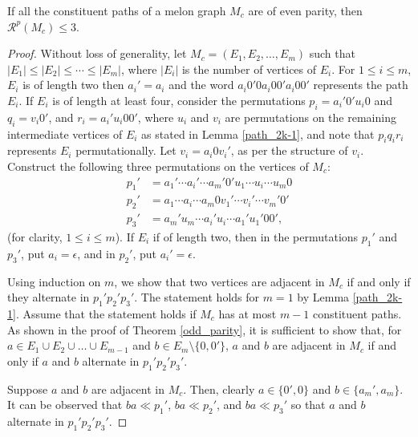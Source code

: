 \documentclass{llncs}
\begin{document}
\begin{theorem}\label{even_parity}
	If all the constituent paths of a melon graph $M_c$ are of even parity, then $\mathcal{R}^p(M_c) \le 3$.
\end{theorem}
\begin{proof}
	Without loss of generality, let $M_c = (E_1,E_2, \ldots, E_m)$ such that $|E_1| \le |E_2|\le \cdots \le |E_m|$, where $|E_i|$ is the number of vertices of $E_i$. For $1 \le i \le m$, $E_i$ is of length two then $a_i' = a_i$ and the word $a_i 0'0 a_i 0  0' a_i 0 0' $ represents the path $E_i$. If $E_i$ is of length at least four, consider the permutations $p_i = a_i' 0' u_i 0$  and $q_i = v_i 0'$, and $r_i = a_i' u_i 0 0'$, where $u_i$ and $v_i$ are permutations on the remaining intermediate vertices of $E_i$ as stated in Lemma \ref{path_2k-1}, and note that $p_iq_ir_i$ represents $E_i$ permutationally. Let $v_i = a_i0v_i'$, as per the structure of $v_i$. Construct the following three permutations on the vertices of $M_c$: 
	\begin{align*}
		p_1' &= a_1' \cdots a_i' \cdots a_m' 0' u_1  \cdots u_i \cdots  u_m 0 \\
		p_2' &= a_1  \cdots a_i  \cdots a_m  0  v_1'  \cdots v_i' \cdots v_m' 0'\\
		p_3' &= a_m'u_m  \cdots a_i' u_i \cdots a_1' u_1'  0 0',
	\end{align*} (for clarity, $1 \le i \le m$).
	If $E_i$ if of length two, then in the permutations $p_1'$ and $p_3'$, put $a_i = \epsilon$, and in $p_2'$, put $a_i' = \epsilon$. 
	
	Using induction on $m$, we show that two vertices are adjacent in $M_c$ if and only if they alternate in $p_1'p_2'p_3'$. 
	The statement holds for $m = 1$ by Lemma \ref{path_2k-1}. Assume that the statement holds if $M_c$ has at most $m - 1$ constituent paths. As shown in the proof of Theorem \ref{odd_parity}, it is sufficient to show that, for $a \in E_1 \cup E_2 \cup \ldots \cup E_{m-1}$ and $b \in E_{m} \setminus \{0,0'\}$, $a$ and $b$ are adjacent in $M_c$ if and only if $a$ and $b$ alternate in $p_1'p_2'p_3'$.
	
	Suppose  $a$ and $b$ are adjacent in $M_c$. Then, clearly $a \in \{0',0\}$ and $b \in \{a_{m}', a_{m}\}$. It can be observed that $ba\ll p_1'$, $ba \ll p_2'$, and $ba \ll  p_3'$ so that $a$ and $b$ alternate in $p_1'p_2'p_3'$.		
	

\end{proof}
\end{document}
